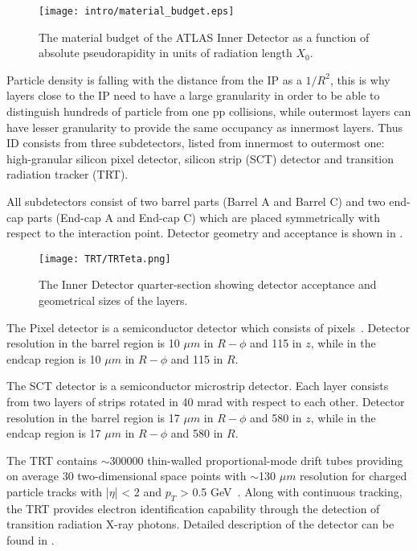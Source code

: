 \begin{figure}
\centering
\texttt{[image: intro/material\_budget.eps]}
\caption{ 
The material budget of the ATLAS Inner Detector as a function of absolute pseudorapidity in units of radiation length $X_0$.
}
\label{fig:material_budget}
\end{figure}


Particle density is falling with the distance from the IP as a $1/R^2$, this is why layers close to the IP need to have a large granularity in order to be able to distinguish 
hundreds of particle from one pp collisions, while outermost layers can have lesser granularity to provide the same occupancy as innermost layers.
Thus ID consists from three subdetectors, listed from innermost to outermost one: high-granular silicon pixel detector, silicon strip (SCT) detector and transition radiation tracker (TRT).

All subdetectors consist of two barrel parts (Barrel A and Barrel C) and two end-cap parts (End-cap A and End-cap C) 
which are placed symmetrically with respect to the interaction point.
Detector geometry and acceptance is shown in .

\begin{figure}
\centering
\texttt{[image: TRT/TRTeta.png]}
\caption{ 
The Inner Detector quarter-section showing detector acceptance and geometrical sizes of the layers.
}
\label{fig:ID_eta}
\end{figure}


The Pixel detector is a semiconductor detector which consists of pixels~\cite{Wermes:381263}.
Detector resolution in the barrel region is 10 $\mu m$ in $R-\phi$ and 115 in $z$,
while in the endcap region is 10 $\mu m$ in $R-\phi$ and 115 in $R$.

The SCT detector is a semiconductor microstrip detector. Each layer consists from
two layers of strips rotated in 40 mrad with respect to each other.
Detector resolution in the barrel region is 17 $\mu m$ in $R-\phi$ and 580 in $z$,
while in the endcap region is 17 $\mu m$ in $R-\phi$ and 580 in $R$.

The TRT contains $\sim$300000 thin-walled proportional-mode drift tubes providing on average 30 two-dimensional 
space points with $\sim$130 $\mu m$ resolution for charged particle tracks with |$\eta$| < 2 and $p_T$ > 0.5 GeV~\cite{Abat:2008zza,Abat:2008zzb,Abat:2008zz}.
Along with continuous tracking, the TRT provides electron identification capability through the detection of transition radiation X-ray photons.
Detailed description of the detector can be found in .




